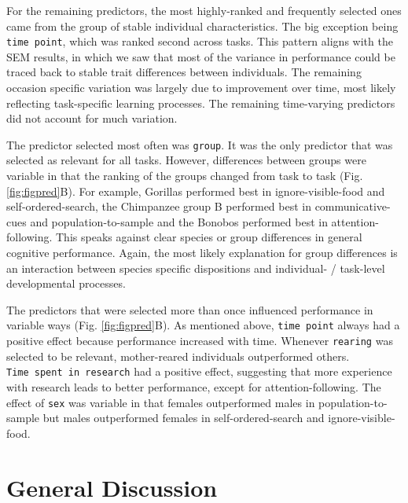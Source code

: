\documentclass[
  man,floatsintext]{apa6}
\begin{document}
For the remaining predictors, the most highly-ranked and frequently selected ones came from the group of stable individual characteristics. The big exception being \texttt{time\ point}, which was ranked second across tasks. This pattern aligns with the SEM results, in which we saw that most of the variance in performance could be traced back to stable trait differences between individuals. The remaining occasion specific variation was largely due to improvement over time, most likely reflecting task-specific learning processes. The remaining time-varying predictors did not account for much variation.

The predictor selected most often was \texttt{group}. It was the only predictor that was selected as relevant for all tasks. However, differences between groups were variable in that the ranking of the groups changed from task to task (Fig. \ref{fig:figpred}B). For example, Gorillas performed best in ignore-visible-food and self-ordered-search, the Chimpanzee group B performed best in communicative-cues and population-to-sample and the Bonobos performed best in attention-following. This speaks against clear species or group differences in general cognitive performance. Again, the most likely explanation for group differences is an interaction between species specific dispositions and individual- / task-level developmental processes.

The predictors that were selected more than once influenced performance in variable ways (Fig. \ref{fig:figpred}B). As mentioned above, \texttt{time\ point} always had a positive effect because performance increased with time. Whenever \texttt{rearing} was selected to be relevant, mother-reared individuals outperformed others. \texttt{Time\ spent\ in\ research} had a positive effect, suggesting that more experience with research leads to better performance, except for attention-following. The effect of \texttt{sex} was variable in that females outperformed males in population-to-sample but males outperformed females in self-ordered-search and ignore-visible-food.

\hypertarget{general-discussion}{%
\section{General Discussion}\label{general-discussion}}
\end{document}
